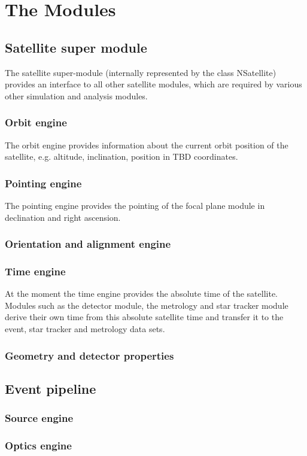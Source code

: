 \chapter{The Modules}

\section{Satellite super module}
The satellite super-module (internally represented by the class NSatellite) provides an interface to all other satellite modules, which are required by various other simulation and analysis modules.
\subsection{Orbit engine}
The orbit engine provides information about the current orbit position of the satellite, e.g. altitude, inclination, position in TBD coordinates.
\subsection{Pointing engine}
The pointing engine provides the pointing of the focal plane module in declination and right ascension.
\subsection{Orientation and alignment engine}
\subsection{Time engine}
At the moment the time engine provides the absolute time of the satellite. Modules such as the detector module, the metrology and star tracker module derive their own time from this absolute satellite time and transfer it to the event, star tracker and metrology data sets.   
\subsection{Geometry and detector properties} 
\section{Event pipeline}
\subsection{Source engine}
\subsection{Optics engine}
